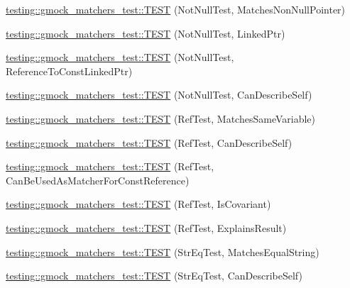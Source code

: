 \begin{DoxyCompactItemize}
\mbox{\hyperlink{namespacetesting_1_1gmock__matchers__test_a694ea33511eab7822b88d8e74b388534}{testing\+::gmock\+\_\+matchers\+\_\+test\+::\+T\+E\+ST}} (Not\+Null\+Test, Matches\+Non\+Null\+Pointer)
\item 
\mbox{\hyperlink{namespacetesting_1_1gmock__matchers__test_aec956599ef91df968fec972247c7a28a}{testing\+::gmock\+\_\+matchers\+\_\+test\+::\+T\+E\+ST}} (Not\+Null\+Test, Linked\+Ptr)
\item 
\mbox{\hyperlink{namespacetesting_1_1gmock__matchers__test_a9e9560feb52f60475f653c15cc7466aa}{testing\+::gmock\+\_\+matchers\+\_\+test\+::\+T\+E\+ST}} (Not\+Null\+Test, Reference\+To\+Const\+Linked\+Ptr)
\item 
\mbox{\hyperlink{namespacetesting_1_1gmock__matchers__test_a68da7653e6a480c60a3a03fe8afb20fc}{testing\+::gmock\+\_\+matchers\+\_\+test\+::\+T\+E\+ST}} (Not\+Null\+Test, Can\+Describe\+Self)
\item 
\mbox{\hyperlink{namespacetesting_1_1gmock__matchers__test_a199983108927dadee9bd2e03ddd6057d}{testing\+::gmock\+\_\+matchers\+\_\+test\+::\+T\+E\+ST}} (Ref\+Test, Matches\+Same\+Variable)
\item 
\mbox{\hyperlink{namespacetesting_1_1gmock__matchers__test_ad8fc5a82cbb4b5b8147798be06d7059b}{testing\+::gmock\+\_\+matchers\+\_\+test\+::\+T\+E\+ST}} (Ref\+Test, Can\+Describe\+Self)
\item 
\mbox{\hyperlink{namespacetesting_1_1gmock__matchers__test_af1e64d057f2c46cc17f1c96a075cde6b}{testing\+::gmock\+\_\+matchers\+\_\+test\+::\+T\+E\+ST}} (Ref\+Test, Can\+Be\+Used\+As\+Matcher\+For\+Const\+Reference)
\item 
\mbox{\hyperlink{namespacetesting_1_1gmock__matchers__test_a03b45cf0f65f33208ac378b8603ff67a}{testing\+::gmock\+\_\+matchers\+\_\+test\+::\+T\+E\+ST}} (Ref\+Test, Is\+Covariant)
\item 
\mbox{\hyperlink{namespacetesting_1_1gmock__matchers__test_ab73595bcf8dd511b519b640248136ccd}{testing\+::gmock\+\_\+matchers\+\_\+test\+::\+T\+E\+ST}} (Ref\+Test, Explains\+Result)
\item 
\mbox{\hyperlink{namespacetesting_1_1gmock__matchers__test_a5956b46686ad29d2d29b313bce9eba8a}{testing\+::gmock\+\_\+matchers\+\_\+test\+::\+T\+E\+ST}} (Str\+Eq\+Test, Matches\+Equal\+String)
\item 
\mbox{\hyperlink{namespacetesting_1_1gmock__matchers__test_a1cb9d74bdf937816807e91b842b22c75}{testing\+::gmock\+\_\+matchers\+\_\+test\+::\+T\+E\+ST}} (Str\+Eq\+Test, Can\+Describe\+Self)
\item 

\end{DoxyCompactItemize}
